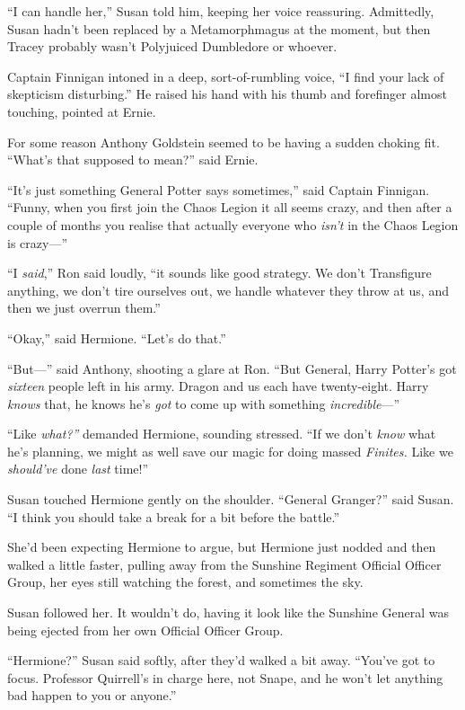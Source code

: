 ``I can handle her,'' Susan told him, keeping her voice reassuring.
Admittedly, Susan hadn't been replaced by a Metamorphmagus at the
moment, but then Tracey probably wasn't Polyjuiced Dumbledore or
whoever.

Captain Finnigan intoned in a deep, sort-of-rumbling voice, ``I find
your lack of skepticism disturbing.'' He raised his hand with his thumb
and forefinger almost touching, pointed at Ernie.

For some reason Anthony Goldstein seemed to be having a sudden choking
fit. ``What's that supposed to mean?'' said Ernie.

``It's just something General Potter says sometimes,'' said Captain
Finnigan. ``Funny, when you first join the Chaos Legion it all seems
crazy, and then after a couple of months you realise that actually
everyone who \emph{isn't} in the Chaos Legion is crazy---''

``I \emph{said},'' Ron said loudly, ``it sounds like good strategy. We
don't Transfigure anything, we don't tire ourselves out, we handle
whatever they throw at us, and then we just overrun them.''

``Okay,'' said Hermione. ``Let's do that.''

``But---'' said Anthony, shooting a glare at Ron. ``But General, Harry
Potter's got \emph{sixteen} people left in his army. Dragon and us each
have twenty-eight. Harry \emph{knows} that, he knows he's \emph{got} to
come up with something \emph{incredible}---''

``Like \emph{what?''} demanded Hermione, sounding stressed. ``If we
don't \emph{know} what he's planning, we might as well save our magic
for doing massed \emph{Finites.} Like we \emph{should've} done
\emph{last} time!''

Susan touched Hermione gently on the shoulder. ``General Granger?'' said
Susan. ``I think you should take a break for a bit before the battle.''

She'd been expecting Hermione to argue, but Hermione just nodded and
then walked a little faster, pulling away from the Sunshine Regiment
Official Officer Group, her eyes still watching the forest, and
sometimes the sky.

Susan followed her. It wouldn't do, having it look like the Sunshine
General was being ejected from her own Official Officer Group.

``Hermione?'' Susan said softly, after they'd walked a bit away.
``You've got to focus. Professor Quirrell's in charge here, not Snape,
and he won't let anything bad happen to you or anyone.''

